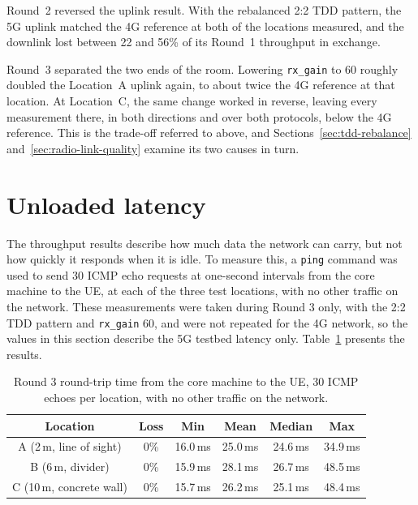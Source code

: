 Round~2 reversed the uplink result. With the rebalanced 2:2 \gls{TDD} pattern, the 5G uplink matched the 4G reference at both of the locations measured, and the downlink lost between 22 and 56\% of its Round~1 throughput in exchange.

\newpage

Round~3 separated the two ends of the room. Lowering \texttt{rx\_gain} to 60 roughly doubled the Location~A uplink again, to about twice the 4G reference at that location. At Location~C, the same change worked in reverse, leaving every measurement there, in both directions and over both protocols, below the 4G reference. This is the trade-off referred to above, and Sections~\ref{sec:tdd-rebalance} and~\ref{sec:radio-link-quality} examine its two causes in turn.

\section{Unloaded latency}
\label{sec:unloaded-latency}

The throughput results describe how much data the network can carry, but not how quickly it responds when it is idle. To measure this, a \texttt{ping} command was used to send 30 ICMP echo requests at one-second intervals from the core machine to the \gls{UE}, at each of the three test locations, with no other traffic on the network. These measurements were taken during Round 3 only, with the 2:2 \gls{TDD} pattern and \texttt{rx\_gain} 60, and were not repeated for the 4G network, so the values in this section describe the 5G testbed latency only. Table~\ref{tab:unloaded-latency} presents the results.

\begin{table}[htbp]
    \centering
    \begin{tabular}{|c|c|c|c|c|c|}
        \hline
        \textbf{Location} & \textbf{Loss} & \textbf{Min} & \textbf{Mean} & \textbf{Median} & \textbf{Max} \\
        \hline
        A (2\,m, line of sight) & 0\% & 16.0\,ms & 25.0\,ms & 24.6\,ms & 34.9\,ms \\
        \hline
        B (6\,m, divider) & 0\% & 15.9\,ms & 28.1\,ms & 26.7\,ms & 48.5\,ms \\
        \hline
        C (10\,m, concrete wall) & 0\% & 15.7\,ms & 26.2\,ms & 25.1\,ms & 48.4\,ms \\
        \hline
    \end{tabular}
    \caption[Round 3 round-trip time with no other traffic.]{Round 3 round-trip time from the core machine to the \gls{UE}, 30 ICMP echoes per location, with no other traffic on the network.}
    \label{tab:unloaded-latency}
\end{table}

